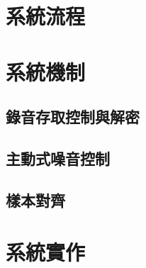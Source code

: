 \section{系統流程}

\section{系統機制}

\subsection{錄音存取控制與解密}

\subsection{主動式噪音控制}

\subsection{樣本對齊}

\section{系統實作}